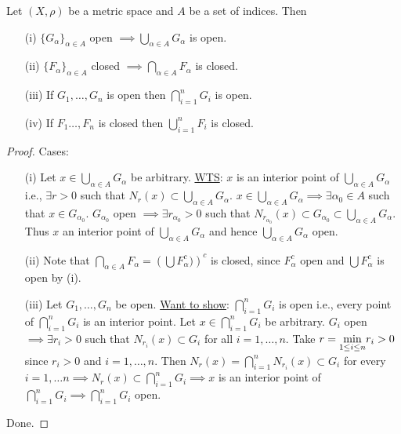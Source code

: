 \documentclass[]{article}
\begin{document}
\begin{theorem}
	Let $(X,\rho)$ be a metric space and $A$ be a set of indices. Then
	\begin{enumerate}
		\item[(i)] $\{G_\alpha\}_{\alpha\in A}$ open $\implies \bigcup_{\alpha\in A} G_\alpha$ is open.
		\item[(ii)] $\{F_\alpha\}_{\alpha\in A}$ closed $\implies \bigcap_{\alpha\in A} F_\alpha$ is closed.
		\item[(iii)] If $G_1,\dots,G_n$ is open then $\bigcap_{i=1}^n G_i$ is open.
		\item[(iv)] If $F_1\dots,F_n$ is closed then $\bigcup_{i=1}^n F_i$ is closed.
	\end{enumerate}
\end{theorem}
\begin{proof}
	Cases:
	\begin{enumerate}
		\item[(i)] Let $x\in \bigcup_{\alpha\in A} G_\alpha$ be arbitrary.
			\ul{WTS}: $x$ is an interior point of $\bigcup_{\alpha\in A} G_\alpha$ i.e., $\exists r>0$ such that $N_r(x)\subset \bigcup_{\alpha\in A} G_\alpha$.
			$x\in\bigcup_{\alpha\in A}G_\alpha \implies \exists \alpha_0\in A$ such that $x\in G_{\alpha_0}$.
			$G_{\alpha_0}$ open $\implies \exists r_{\alpha_0}>0$ such that $N_{r_{\alpha_0}}(x)\subset G_{\alpha_0} \subset \bigcup_{\alpha\in A} G_\alpha$.
			Thus $x$ an interior point of $\bigcup_{\alpha\in A} G_\alpha$ and hence $\bigcup_{\alpha\in A} G_\alpha$ open.
		\item[(ii)] Note that $\bigcap_{\alpha\in A} F_\alpha = \left(\bigcup F_\alpha^c)\right)^c$ is closed, since $F_\alpha^c$ open and $\bigcup F_\alpha^c$ is open by (i).
		\item[(iii)] Let $G_1,\dots,G_n$ be open.
			\ul{Want to show}: $\bigcap_{i=1}^n G_i$ is open i.e., every point of $\bigcap_{i=1}^n G_i$ is an interior point.
			Let $x\in\bigcap_{i=1}^n G_i$ be arbitrary. $G_i$ open $\implies\exists r_i>0$ such that $N_{r_i}(x)\subset G_i$ for all $i=1,\dots,n$.
			Take $r=\underset{1\leq i\leq n}{\min} r_i>0$ since $r_i>0$ and $i=1,\dots,n$.
			Then $N_r(x) = \bigcap_{i=1}^n N_{r_i}(x)\subset G_i$ for every $i=1,\dots n \implies N_r(x)\subset\bigcap_{i=1}^n G_i \implies x$ is an interior point of $\bigcap_{i=1}^n G_i \implies \bigcap_{i=1}^n G_i$ open.
	\end{enumerate}
	Done.
\end{proof}
\end{document}
